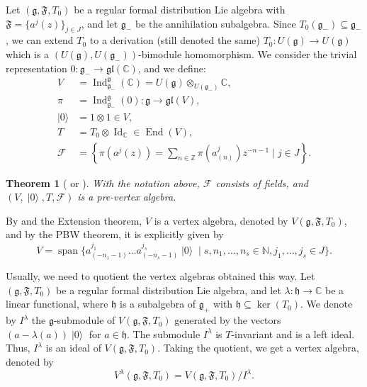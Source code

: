 \documentclass[a4paper, 12pt, reqno]{amsart}
\newtheorem{theorem}{Theorem}[section]
\theoremstyle{remark}
\DeclareMathOperator{\Ind}{Ind}
\DeclareMathOperator{\vac}{|0\rangle}
\DeclareMathOperator{\vspan}{span}
\DeclareMathOperator{\End}{End}
\DeclareMathOperator{\Id}{Id}
\begin{document}
Let $(\mathfrak{g}, \mathfrak{F}, T_0)$ be a regular formal distribution Lie algebra with $\mathfrak{F} = \{a^j(z)\}_{j \in J}$, and let $\mathfrak{g}_-$ be the annihilation subalgebra.
Since $T_0(\mathfrak{g}_-) \subseteq \mathfrak{g}_-$, we can extend $T_0$ to a derivation (still denoted the same) $T_0: U(\mathfrak{g}) \to U(\mathfrak{g})$ which is a $(U(\mathfrak{g}), U(\mathfrak{g}_-))$-bimodule homomorphism.
We consider the trivial representation $0: \mathfrak{g}_- \to \mathfrak{gl}(\mathbb{C})$, and we define:
\begin{align*}
  V &= \Ind^{\mathfrak{g}}_{\mathfrak{g}_-}(\mathbb{C}) = U(\mathfrak{g}) \otimes_{U(\mathfrak{g}_-)} \mathbb{C}, \\
  \pi &= \Ind^{\mathfrak{g}}_{\mathfrak{g}_-}(0): \mathfrak{g} \to \mathfrak{gl}(V), \\
  \vac &= 1\otimes1 \in V, \\
  T &= T_0\otimes\Id_{\mathbb{C}} \in \End(V), \\
  \mathcal{F} &= \left\{\pi(a^j(z)) = \sum_{n \in \mathbb{Z}}\pi(a^j_{(n)})z^{-n - 1} \mid j \in J\right\}.
\end{align*}

\begin{theorem}[{\cite[Theorem 3]{callegaro_introduction_2017-1} or \cite[\S1.7]{de_sole_finite_2006}}]
  \label{thr:5}
  With the notation above, $\mathcal{F}$ consists of fields, and $(V, \vac, T, \mathcal{F})$ is a pre-vertex algebra.
\end{theorem}

By  and the Extension theorem, $V$ is a vertex algebra, denoted by $V(\mathfrak{g}, \mathfrak{F}, T_0)$, and by the PBW theorem, it is explicitly given by
\begin{equation*}
  V = \vspan\{a^{j_1}_{(-n_1 - 1)}\dots a^{j_s}_{(-n_s - 1)}\vac \mid s, n_1, \dots, n_s \in \mathbb{N}, j_1, \dots, j_s \in J\}.
\end{equation*}

Usually, we need to quotient the vertex algebras obtained this way.
Let $(\mathfrak{g}, \mathfrak{F}, T_0)$ be a regular formal distribution Lie algebra, and let $\lambda: \mathfrak{h} \to \mathbb{C}$ be a linear functional, where $\mathfrak{h}$ is a subalgebra of $\mathfrak{g}_+$ with $\mathfrak{h} \subseteq \ker(T_0)$.
We denote by $I^{\lambda}$ the $\mathfrak{g}$-submodule of $V(\mathfrak{g}, \mathfrak{F}, T_0)$ generated by the vectors $(a - \lambda(a))\vac$ for $a \in \mathfrak{h}$.
The submodule $I^{\lambda}$ is $T$-invariant and is a left ideal.
Thus, $I^{\lambda}$ is an ideal of $V(\mathfrak{g}, \mathfrak{F}, T_0)$.
Taking the quotient, we get a vertex algebra, denoted by
\begin{equation*}
  V^{\lambda}(\mathfrak{g}, \mathfrak{F}, T_0) = V(\mathfrak{g}, \mathfrak{F}, T_0)/I^{\lambda}.
\end{equation*}
\end{document}
